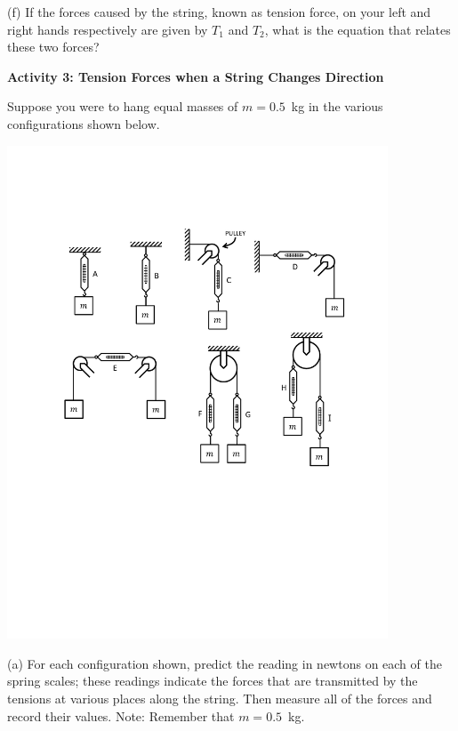 (f) If the forces caused by the string, known as tension force, on your left and right hands respectively
are given by $T_{1}$ and $T_{2}$, what is the equation that relates
these two forces?
\answerspace{20mm}

\pagebreak[3]
\textbf{Activity 3: Tension Forces when a String Changes Direction }

Suppose you were to hang equal masses of $m = 0.5$~kg in the various configurations
shown below. 

{\par\centering \includegraphics[width=0.85\textwidth]{newton/newton_fig5_new.pdf} \par}


(a) For each configuration shown, predict the reading in newtons on each
of the spring scales; these readings indicate the forces that are transmitted
by the tensions at various places along the string. Then measure all of the
forces and record their values. Note: Remember that $m = 0.5$~kg.

